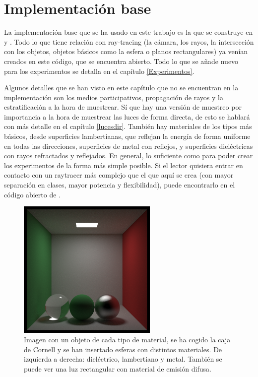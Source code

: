 \documentclass{scrbook}
\begin{document}
\section{Implementación base}
\label{Implementacion}
La implementación base que se ha usado en este trabajo es la que se construye en \cite{Weekend} y \cite{NextWeek}. Todo lo que tiene relación con ray-tracing (la cámara, los rayos, la intersección con los objetos, objetos básicos como la esfera o planos rectangulares) ya venían creados en este código, que se encuentra abierto. Todo lo que se añade nuevo para los experimentos se detalla en el capítulo \ref{Experimentos}.

Algunos detalles que se han visto en este capítulo que no se encuentran en la implementación son los medios participativos, propagación de rayos y la estratificación a la hora de muestrear. Sí que hay una versión de muestreo por importancia a la hora de muestrear las luces de forma directa, de esto se hablará con más detalle en el capítulo \ref{lucesdir}. También hay materiales de los tipos más básicos, desde superficies lambertianas, que reflejan la energía de forma uniforme en todas las direcciones, superficies de metal con reflejos, y superficies dieléctricas con rayos refractados y reflejados. En general, lo suficiente como para poder crear los experimentos de la forma más simple posible. Si el lector quisiera entrar en contacto con un raytracer más complejo que el que aquí se crea (con mayor separación en clases, mayor potencia y flexibilidad), puede encontrarlo en el código abierto de \cite{pbrt}.


\begin{figure}[ht]
	\centering
	\includegraphics[width=0.6\textwidth]{material_ex}
	\caption{Imagen con un objeto de cada tipo de material, se ha cogido la caja de Cornell y se han insertado esferas con distintos materiales. De izquierda a derecha: dieléctrico, lambertiano y metal. También se puede ver una luz rectangular con material de emisión difusa.}
	\label{fig:mat}
\end{figure}
\end{document}
